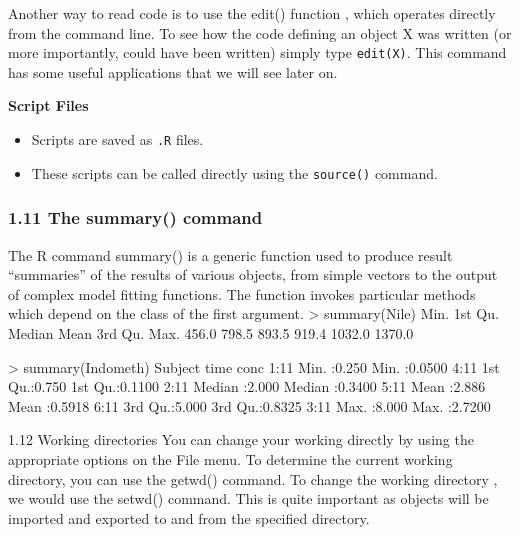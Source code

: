  
 Another way to read code is to use the edit() function , which operates directly from the
 command line. To see how the code defining an object X was written (or more importantly,
 could have been written) simply type \texttt{edit(X)}. This command has some useful applications
 that we will see later on.
 
 
 
 
 \textbf{Script Files}
 \begin{itemize}
 \item Scripts are saved as \texttt{.R} files. 
 \item These scripts can be called directly using the \texttt{source()} command.
 \end{itemize}
 
 
 
 
 \frametitle{1.11 The summary() command}
 The R command summary() is a generic function used to produce result “summaries” of the
 results of various objects, from simple vectors to the output of complex model fitting functions.
 The function invokes particular methods which depend on the class of the first argument.
 > summary(Nile)
 Min. 1st Qu. Median Mean 3rd Qu. Max.
 456.0 798.5 893.5 919.4 1032.0 1370.0
 
 
 > summary(Indometh)
 Subject time conc
 1:11 Min. :0.250 Min. :0.0500
 4:11 1st Qu.:0.750 1st Qu.:0.1100
 2:11 Median :2.000 Median :0.3400
 5:11 Mean :2.886 Mean :0.5918
 6:11 3rd Qu.:5.000 3rd Qu.:0.8325
 3:11 Max. :8.000 Max. :2.7200
 
 
 1.12 Working directories
 You can change your working directly by using the appropriate options on the File menu. To
 determine the current working directory, you can use the getwd() command. To change the
 working directory , we would use the setwd() command. This is quite important as objects
 will be imported and exported to and from the specified directory.
 
 
